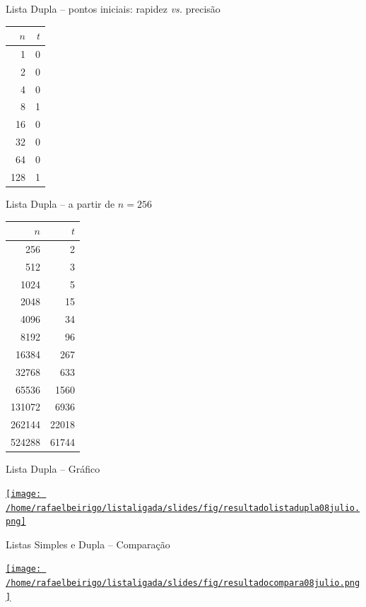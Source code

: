 \documentclass[bigger]{beamer}
\begin{document}
\begin{frame}[label=sec-3-1-4]{Lista Dupla -- pontos iniciais: rapidez \emph{vs.} precisão}
\begin{center}
\begin{tabular}{rr}
$n$ & $t$\\
\hline
1 & 0\\
2 & 0\\
4 & 0\\
8 & 1\\
16 & 0\\
32 & 0\\
64 & 0\\
128 & 1\\
\end{tabular}
\end{center}
\end{frame}
\begin{frame}[label=sec-3-1-5]{Lista Dupla -- a partir de $n = 256$}
\begin{center}
\begin{tabular}{rr}
$n$ & $t$\\
\hline
256 & 2\\
512 & 3\\
1024 & 5\\
2048 & 15\\
4096 & 34\\
8192 & 96\\
16384 & 267\\
32768 & 633\\
65536 & 1560\\
131072 & 6936\\
262144 & 22018\\
524288 & 61744\\
\end{tabular}
\end{center}
\end{frame}
\begin{frame}[label=sec-3-1-6]{Lista Dupla -- Gráfico}
\begin{center}
\href{fig/resultadolistadupla08julio.png}{\texttt{[image: /home/rafaelbeirigo/listaligada/slides/fig/resultadolistadupla08julio.png]}}
\end{center}
\end{frame}
\begin{frame}[label=sec-3-1-7]{Listas Simples e Dupla -- Comparação}
\begin{center}
\href{fig/resultadocompara08julio.png}{\texttt{[image: /home/rafaelbeirigo/listaligada/slides/fig/resultadocompara08julio.png]}}
\end{center}
\end{frame}
\end{document}

